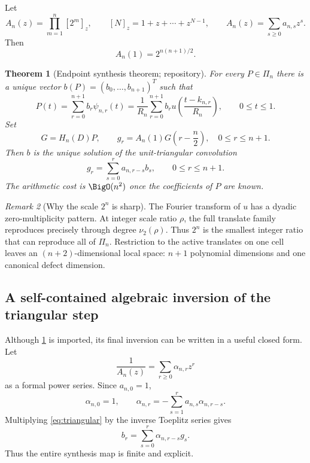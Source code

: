 \documentclass[11pt,oneside]{article}
\newtheorem{theorem}{Theorem}[section]
\theoremstyle{definition}
\theoremstyle{remark}
\newtheorem{remark}[theorem]{Remark}
\newcommand{\1}{\mathbf{1}}
\begin{document}
Let
\begin{equation}
 A_n(z)=\prod_{m=1}^n[2^m]_z,
 \qquad [N]_z=1+z+\cdots+z^{N-1},
 \qquad
 A_n(z)=\sum_{s\ge0}a_{n,s}z^s.
 \label{eq:An}
\end{equation}
Then
\begin{equation}
 A_n(1)=2^{n(n+1)/2}.
 \label{eq:A1}
\end{equation}

\begin{theorem}[Endpoint synthesis theorem; repository]
\label{thm:endpoint-imported}
For every $P\in\Pi_n$ there is a unique vector
$b(P)=(b_0,\ldots,b_{n+1})^T$ such that
\begin{equation}
 P(t)=\sum_{r=0}^{n+1}b_r\psi_{n,r}(t)
 =\frac1{R_n}\sum_{r=0}^{n+1}b_r
 u\!\left(\frac{t-k_{n,r}}{R_n}\right),
 \qquad 0\le t\le1.
 \label{eq:endpoint-synth}
\end{equation}
Set
\[
 G=H_n(D)P,
 \qquad
 g_r=A_n(1)G\!\left(r-\frac n2\right),
 \quad 0\le r\le n+1.
\]
Then $b$ is the unique solution of the unit-triangular convolution
\begin{equation}
 g_r=\sum_{s=0}^r a_{n,r-s}b_s,
 \qquad 0\le r\le n+1.
 \label{eq:triangular}
\end{equation}
The arithmetic cost is $\BigO(n^2)$ once the coefficients of $P$ are known.
\end{theorem}

\begin{remark}[Why the scale $2^n$ is sharp]
The Fourier transform of $u$ has a dyadic zero-multiplicity pattern.  At
integer scale ratio $\rho$, the full translate family reproduces precisely
through degree $\nu_2(\rho)$.  Thus $2^n$ is the smallest integer ratio that
can reproduce all of $\Pi_n$.  Restriction to the active translates on one
cell leaves an $(n+2)$-dimensional local space: $n+1$ polynomial dimensions
and one canonical defect dimension.
\end{remark}

\subsection{A self-contained algebraic inversion of the triangular step}

Although \cref{thm:endpoint-imported} is imported, its final inversion can be
written in a useful closed form.  Let
\begin{equation}
 \frac1{A_n(z)}=\sum_{r\ge0}\alpha_{n,r}z^r
 \label{eq:alpha-def}
\end{equation}
as a formal power series.  Since $a_{n,0}=1$,
\begin{equation}
 \alpha_{n,0}=1,
 \qquad
 \alpha_{n,r}=-\sum_{s=1}^r a_{n,s}\alpha_{n,r-s}.
 \label{eq:alpha-rec}
\end{equation}
Multiplying \eqref{eq:triangular} by the inverse Toeplitz series gives
\begin{equation}
 b_r=\sum_{s=0}^r\alpha_{n,r-s}g_s.
 \label{eq:b-alpha}
\end{equation}
Thus the entire synthesis map is finite and explicit.
\end{document}
